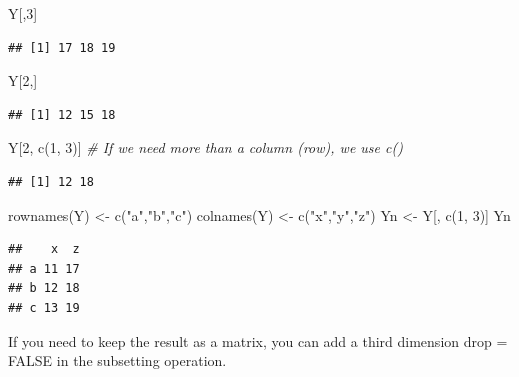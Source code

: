 \documentclass[
]{book}
\newenvironment{Shaded}{\begin{snugshade}}{\end{snugshade}}
\newcommand{\CommentTok}[1]{\textcolor[rgb]{0.56,0.35,0.01}{\textit{#1}}}
\newcommand{\DecValTok}[1]{\textcolor[rgb]{0.00,0.00,0.81}{#1}}
\newcommand{\FunctionTok}[1]{\textcolor[rgb]{0.00,0.00,0.00}{#1}}
\newcommand{\NormalTok}[1]{#1}
\newcommand{\OtherTok}[1]{\textcolor[rgb]{0.56,0.35,0.01}{#1}}
\newcommand{\StringTok}[1]{\textcolor[rgb]{0.31,0.60,0.02}{#1}}
\begin{document}
\begin{Shaded}
\begin{Highlighting}[]
\NormalTok{Y[,}\DecValTok{3}\NormalTok{]}
\end{Highlighting}
\end{Shaded}

\begin{verbatim}
## [1] 17 18 19
\end{verbatim}

\begin{Shaded}
\begin{Highlighting}[]
\NormalTok{Y[}\DecValTok{2}\NormalTok{,]}
\end{Highlighting}
\end{Shaded}

\begin{verbatim}
## [1] 12 15 18
\end{verbatim}

\begin{Shaded}
\begin{Highlighting}[]
\NormalTok{Y[}\DecValTok{2}\NormalTok{, }\FunctionTok{c}\NormalTok{(}\DecValTok{1}\NormalTok{, }\DecValTok{3}\NormalTok{)] }\CommentTok{\# If we need more than a column (row), we use c()}
\end{Highlighting}
\end{Shaded}

\begin{verbatim}
## [1] 12 18
\end{verbatim}

\begin{Shaded}
\begin{Highlighting}[]
\FunctionTok{rownames}\NormalTok{(Y) }\OtherTok{\textless{}{-}} \FunctionTok{c}\NormalTok{(}\StringTok{"a"}\NormalTok{,}\StringTok{"b"}\NormalTok{,}\StringTok{"c"}\NormalTok{)}
\FunctionTok{colnames}\NormalTok{(Y) }\OtherTok{\textless{}{-}} \FunctionTok{c}\NormalTok{(}\StringTok{"x"}\NormalTok{,}\StringTok{"y"}\NormalTok{,}\StringTok{"z"}\NormalTok{)}
\NormalTok{Yn }\OtherTok{\textless{}{-}}\NormalTok{ Y[, }\FunctionTok{c}\NormalTok{(}\DecValTok{1}\NormalTok{, }\DecValTok{3}\NormalTok{)]}
\NormalTok{Yn}
\end{Highlighting}
\end{Shaded}

\begin{verbatim}
##    x  z
## a 11 17
## b 12 18
## c 13 19
\end{verbatim}

If you need to keep the result as a matrix, you can add a third dimension drop = FALSE in the subsetting operation.
\end{document}
